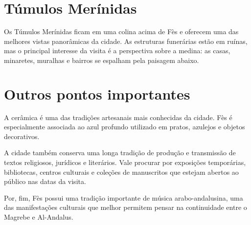\chapter{Túmulos Merínidas}

Os Túmulos Merínidas ficam em uma colina acima de Fès e oferecem uma das melhores vistas panorâmicas da cidade. As estruturas funerárias estão em ruínas, mas o principal interesse da visita é a perspectiva sobre a medina: as casas, minaretes, muralhas e bairros se espalham pela paisagem abaixo.

\chapter{Outros pontos importantes}

A cerâmica é uma das tradições artesanais mais conhecidas da cidade. Fès é especialmente associada ao azul profundo utilizado em pratos, azulejos e objetos decorativos. 

A cidade também conserva uma longa tradição de produção e transmissão de textos religiosos, jurídicos e literários. Vale procurar por exposições temporárias, bibliotecas, centros culturais e coleções de manuscritos que estejam abertos ao público nas datas da visita.

Por, fim, Fès possui uma tradição importante de música arabo-andalusina, uma das manifestações culturais que melhor permitem pensar na continuidade entre o Magrebe e Al-Andalus.